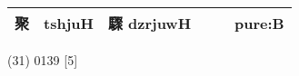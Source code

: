 \documentclass[14pt,a4paper]{scrartcl}
\begin{document}
\begin{longtable}[c]{@{}llllll@{}}
\begin{minipage}[t]{0.14\columnwidth}\raggedright\strut
聚
\strut\end{minipage} &
\begin{minipage}[t]{0.14\columnwidth}\raggedright\strut
tshjuH
\strut\end{minipage} &
\begin{minipage}[t]{0.14\columnwidth}\raggedright\strut
驟 dzrjuwH
\strut\end{minipage} &
\begin{minipage}[t]{0.14\columnwidth}\raggedright\strut
\strut\end{minipage} &
\begin{minipage}[t]{0.14\columnwidth}\raggedright\strut
\strut\end{minipage} &
\begin{minipage}[t]{0.14\columnwidth}\raggedright\strut
pure:B
\strut\end{minipage}\tabularnewline
\bottomrule
\end{longtable}

(31) 0139 {[}5{]}
\end{document}
